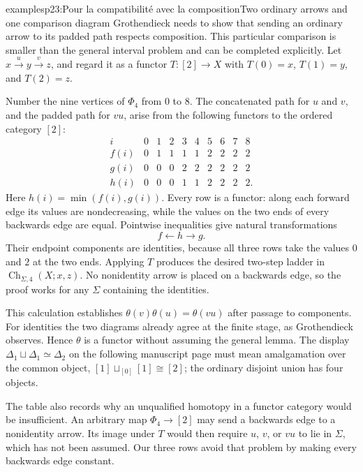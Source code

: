 \begin{dcomment}{examples}{p23:Pour la compatibilité avec la composition}{Two ordinary arrows and one comparison diagram}
Grothendieck needs to show that sending an ordinary arrow to its padded path respects composition. This particular comparison is smaller than the general interval problem and can be completed explicitly. Let $x\xrightarrow{u}y\xrightarrow{v}z$, and regard it as a functor $T:[2]\to X$ with $T(0)=x$, $T(1)=y$, and $T(2)=z$.

Number the nine vertices of $\Phi_4$ from $0$ to $8$. The concatenated path for $u$ and $v$, and the padded path for $vu$, arise from the following functors to the ordered category $[2]$:
\[
\begin{array}{c|rrrrrrrrr}
 i&0&1&2&3&4&5&6&7&8\\ \hline
 f(i)&0&1&1&1&1&2&2&2&2\\
 g(i)&0&0&0&2&2&2&2&2&2\\
 h(i)&0&0&0&1&1&2&2&2&2.
\end{array}
\]
Here $h(i)=\min(f(i),g(i))$. Every row is a functor: along each forward edge its values are nondecreasing, while the values on the two ends of every backwards edge are equal. Pointwise inequalities give natural transformations
\[
 f\longleftarrow h\longrightarrow g.
\]
Their endpoint components are identities, because all three rows take the values $0$ and $2$ at the two ends. Applying $T$ produces the desired two-step ladder in $\operatorname{Ch}_{\Sigma,4}(X;x,z)$. No nonidentity arrow is placed on a backwards edge, so the proof works for any $\Sigma$ containing the identities.

This calculation establishes $\theta(v)\theta(u)=\theta(vu)$ after passage to components. For identities the two diagrams already agree at the finite stage, as Grothendieck observes. Hence $\theta$ is a functor without assuming the general lemma. The display $\Delta_1\sqcup\Delta_1\simeq\Delta_2$ on the following manuscript page must mean amalgamation over the common object, $[1]\sqcup_{[0]}[1]\cong[2]$; the ordinary disjoint union has four objects.

The table also records why an unqualified homotopy in a functor category would be insufficient. An arbitrary map $\Phi_4\to[2]$ may send a backwards edge to a nonidentity arrow. Its image under $T$ would then require $u$, $v$, or $vu$ to lie in $\Sigma$, which has not been assumed. Our three rows avoid that problem by making every backwards edge constant.
\end{dcomment}

